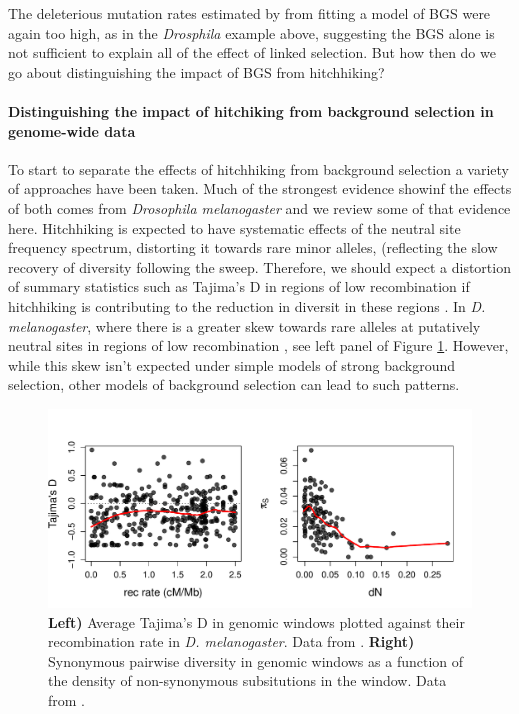 The deleterious mutation rates estimated by \citet{Mcvicker:09} from
fitting a model of BGS were again too high, as in the {\it Drosphila}
example above, suggesting the BGS alone is not sufficient to
explain all of the effect of linked selection. But how then do we go about distinguishing the impact of BGS from hitchhiking? 

\paragraph{Distinguishing the impact of hitchiking from  background selection in
  genome-wide data}

To start to separate the effects of hitchhiking from background
selection a variety of approaches have been taken. Much of the
strongest evidence showinf the effects of both comes from
\textit{Drosophila melanogaster} and we review some of that evidence here. 
Hitchhiking is expected to have systematic effects of the neutral site
frequency spectrum, distorting it towards rare minor alleles,
(reflecting the slow recovery of diversity following the
sweep. Therefore, we should expect a distortion of summary
statistics such as Tajima's D in regions of low recombination if
hitchhiking is contributing to the reduction in diversit in these
regions \citep{Braverman:95, Przeworski:02,Kim:06}. In \textit{D. melanogaster}, where there is a greater skew towards rare
alleles at putatively neutral sites in regions of low recombination
\citep{Andolfatto:01,Shapiro:07}, see left panel of Figure
\ref{fig:Tajimas_D_dN_pi}. However, while this skew isn't expected under
simple models of strong background selection, other models of background selection
can lead to such patterns. 

\begin{figure}
\begin{center}
\includegraphics[width=\textwidth]{Journal_figs/recom_selection/Andolfatto_subs_vs_dN/Tajimas_D_subs_vs_dN.pdf}
\end{center}
\caption{{\bf Left)} Average Tajima's D in genomic windows plotted
  against their recombination rate in \textit{D. melanogaster}. Data
  from \citet{Shapiro:07}. {\bf Right)} Synonymous pairwise diversity
  in genomic windows  as a function of the density of non-synonymous
  subsitutions in the window. Data from \citet{Andolfatto:07}. } \label{fig:Tajimas_D_dN_pi}
\end{figure}

